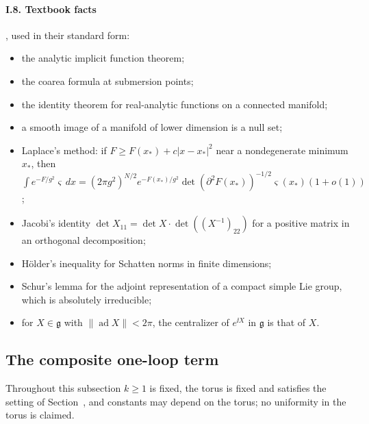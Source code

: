 \paragraph{I.8. Textbook facts}, used in their standard form:
\begin{itemize}
\item the analytic implicit function theorem;
\item the coarea formula at submersion points;
\item the identity theorem for real-analytic functions on a connected manifold;
\item a smooth image of a manifold of lower dimension is a null set;
\item Laplace's method: if $F\ge F(x_*)+c|x-x_*|^2$ near a nondegenerate minimum $x_*$, then $\int e^{-F/g^2}\varsigma\,dx=(2\pi g^2)^{N/2}e^{-F(x_*)/g^2}\det(\partial^2F(x_*))^{-1/2}\varsigma(x_*)(1+o(1))$;
\item Jacobi's identity $\det X_{11}=\det X\cdot\det((X^{-1})_{22})$ for a positive matrix in an orthogonal decomposition;
\item H\"older's inequality for Schatten norms in finite dimensions;
\item Schur's lemma for the adjoint representation of a compact simple Lie group, which is absolutely irreducible;
\item for $X\in\mathfrak g$ with $\|\operatorname{ad}X\|<2\pi$, the centralizer of $e^{\ii X}$ in $\mathfrak g$ is that of $X$.
\end{itemize}

\subsection{The composite one-loop term}\label{d11a:composite}

Throughout this subsection $k\ge1$ is fixed, the torus is fixed and satisfies the setting of Section~, and constants may depend on the torus; no uniformity in the torus is claimed.

